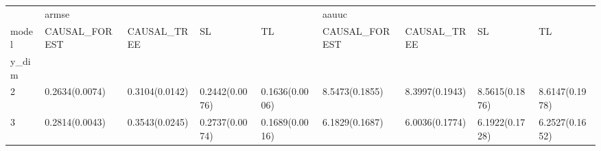 \begin{tabular}{lllllllll}
\toprule
{} & \multicolumn{4}{l}{armse} & \multicolumn{4}{l}{aauuc} \\
model &   CAUSAL\_FOREST &     CAUSAL\_TREE &              SL &              TL &   CAUSAL\_FOREST &     CAUSAL\_TREE &              SL &              TL \\
y\_dim &                 &                 &                 &                 &                 &                 &                 &                 \\
\midrule
2     &  0.2634(0.0074) &  0.3104(0.0142) &  0.2442(0.0076) &  0.1636(0.0006) &  8.5473(0.1855) &  8.3997(0.1943) &  8.5615(0.1876) &  8.6147(0.1978) \\
3     &  0.2814(0.0043) &  0.3543(0.0245) &  0.2737(0.0074) &  0.1689(0.0016) &  6.1829(0.1687) &  6.0036(0.1774) &  6.1922(0.1728) &  6.2527(0.1652) \\
\bottomrule
\end{tabular}
